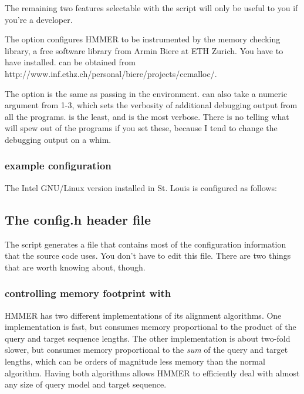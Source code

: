 The remaining two features selectable with the  script
will only be useful to you if you're a developer.

The  option configures HMMER to be
instrumented by the  memory checking library, a free
software library from Armin Biere at ETH Zurich.  You have to have
 installed.   can be obtained from
{http://www.inf.ethz.ch/personal/biere/projects/ccmalloc/}.

The  option is the same as passing
 in the environment.  can
also take a numeric argument from 1-3, which sets the verbosity of
additional debugging output from all the
programs.  is the least, and
 is the most verbose. There is no telling
what will spew out of the programs if you set these, because I tend to
change the debugging output on a whim.

\subsubsection{example configuration}

The Intel GNU/Linux version installed in St. Louis is configured as
follows:


\subsection{The config.h header file}

The  script generates a  file that
contains most of the configuration information that the source code
uses. You don't have to edit this file.  There are two things that are
worth knowing about, though.

\subsubsection{controlling memory footprint with }

HMMER has two different implementations of its alignment algorithms.
One implementation is fast, but consumes memory proportional to the
product of the query and target sequence lengths. The other
implementation is about two-fold slower, but consumes memory
proportional to the \emph{sum} of the query and target lengths, which
can be orders of magnitude less memory than the normal algorithm.
Having both algorithms allows HMMER to efficiently deal with almost
any size of query model and target sequence.

